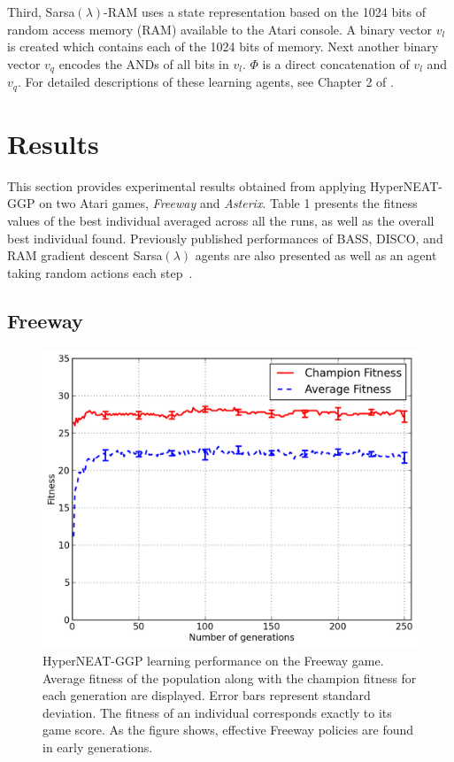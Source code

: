 \documentclass{sig-alternate}
\begin{document}
Third, Sarsa$(\lambda)$-RAM uses a state representation based on the 1024 bits of random access memory (RAM) available to the Atari console. A binary vector $v_l$ is created which contains each of the 1024 bits of memory. Next another binary vector $v_q$ encodes the ANDs of all bits in $v_l$. $\Phi$ is a direct concatenation of $v_l$ and $v_q$. For detailed descriptions of these learning agents, see Chapter 2 of \cite{naddaf10}.

\section{Results}
\label{sec:results}
This section provides experimental results obtained from applying HyperNEAT-GGP on two Atari games, \textit{Freeway} and \textit{Asterix}. Table 1 presents the fitness values of the best individual averaged across all the runs, as well as the overall best individual found. Previously published performances of BASS, DISCO, and RAM gradient descent Sarsa$(\lambda)$ agents are also presented as well as an agent taking random actions each step~\cite{naddaf10}. 

\subsection {Freeway}

\begin{figure}[ht]
\begin{center}
\includegraphics[width=\columnwidth]{figures/freeway-results}
\end{center}
\caption{HyperNEAT-GGP learning performance on the Freeway game. Average fitness of the population along with the champion fitness for each generation are displayed. Error bars represent standard deviation. The fitness of an individual corresponds exactly to its game score. As the figure shows, effective Freeway policies are found in early generations.}
\label{fig:freeway-curve}
\end{figure}
\end{document}
